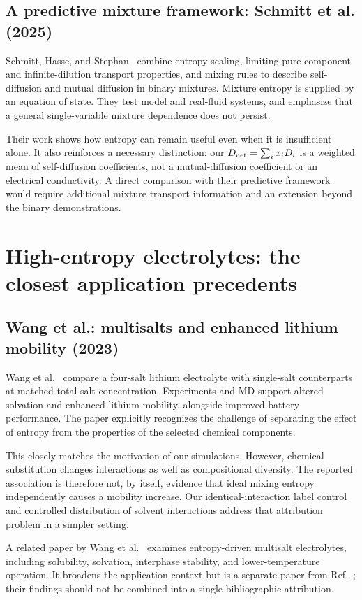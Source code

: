 \documentclass[11pt,a4paper]{article}
\begin{document}
\subsection{A predictive mixture framework: Schmitt et al. (2025)}
Schmitt, Hasse, and Stephan~\cite{Schmitt2025} combine entropy scaling,
limiting pure-component and infinite-dilution transport properties, and
mixing rules to describe self-diffusion and mutual diffusion in binary
mixtures. Mixture entropy is supplied by an equation of state. They test
model and real-fluid systems, and emphasize that a general single-variable
mixture dependence does not persist.

Their work shows how entropy can remain useful even when it is insufficient
alone. It also reinforces a necessary distinction: our
$D_{\rm net}=\sum_i x_iD_i$ is a weighted mean of self-diffusion coefficients,
not a mutual-diffusion coefficient or an electrical conductivity. A direct
comparison with their predictive framework would require additional mixture
transport information and an extension beyond the binary demonstrations.

\section{High-entropy electrolytes: the closest application precedents}
\subsection{Wang et al.: multisalts and enhanced lithium mobility (2023)}
Wang et al.~\cite{Wang2023} compare a four-salt lithium electrolyte with
single-salt counterparts at matched total salt concentration. Experiments
and MD support altered solvation and enhanced lithium mobility, alongside
improved battery performance. The paper explicitly recognizes the challenge
of separating the effect of entropy from the properties of the selected
chemical components.

This closely matches the motivation of our simulations. However, chemical
substitution changes interactions as well as compositional diversity. The
reported association is therefore not, by itself, evidence that ideal mixing
entropy independently causes a mobility increase. Our identical-interaction
label control and controlled distribution of solvent interactions address
that attribution problem in a simpler setting.

A related paper by Wang et al.~\cite{WangAdvanced2023} examines entropy-driven
multisalt electrolytes, including solubility, solvation, interphase stability,
and lower-temperature operation. It broadens the application context but
is a separate paper from Ref.~\cite{Wang2023}; their findings should not be
combined into a single bibliographic attribution.
\end{document}
